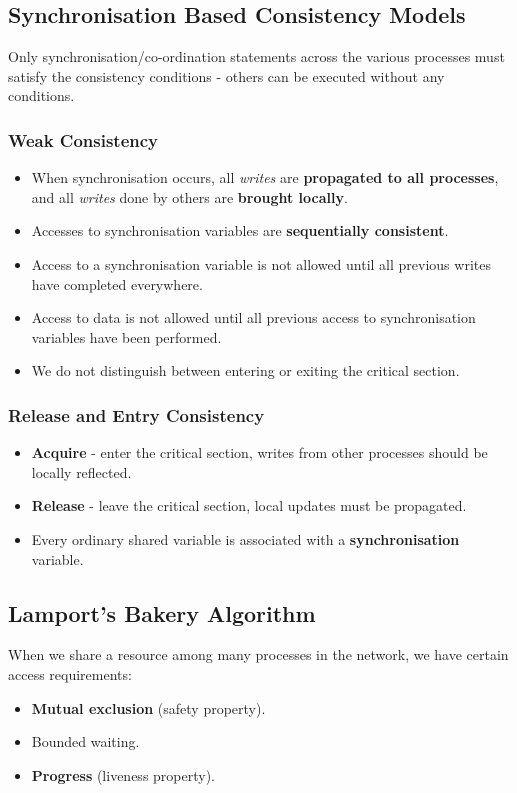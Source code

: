 \documentclass[11pt]{article}
\begin{document}
\subsection{Synchronisation Based Consistency Models}
Only synchronisation/co-ordination statements across the various processes must satisfy the consistency conditions - others can be executed without any conditions.

\subsubsection{Weak Consistency}
\begin{itemize}
  \item When synchronisation occurs, all \textit{writes} are \textbf{propagated to all processes}, and all \textit{writes} done by others are \textbf{brought locally}.
  \item Accesses to synchronisation variables are \textbf{sequentially consistent}.
  \item Access to a synchronisation variable is not allowed until all previous writes have completed everywhere.
  \item Access to data is not allowed until all previous access to synchronisation variables have been performed.
  \item We do not distinguish between entering or exiting the critical section.
\end{itemize}

\subsubsection{Release and Entry Consistency}
\begin{itemize}
  \item \textbf{Acquire} - enter the critical section, writes from other processes should be locally reflected.
  \item \textbf{Release} - leave the critical section, local updates must be propagated.
  \item Every ordinary shared variable is associated with a \textbf{synchronisation} variable.
\end{itemize}

\subsection{Lamport's Bakery Algorithm}
When we share a resource among many processes in the network, we have certain access requirements:
\begin{itemize}
  \item \textbf{Mutual exclusion} (safety property).
  \item Bounded waiting.
  \item \textbf{Progress} (liveness property).
\end{itemize}
\end{document}
